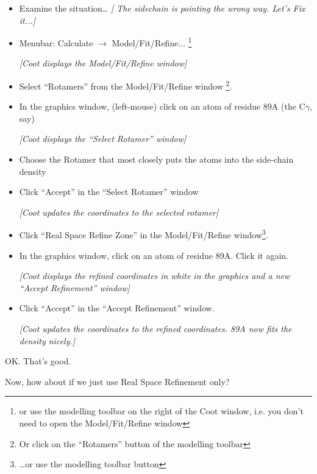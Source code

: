 \documentclass{article}
\begin{document}
\begin{itemize}
\item Examine the situation\ldots
  \emph{[ The sidechain is pointing the wrong way.  Let's Fix it...]}

\item Menubar: \textsf{Calculate $\rightarrow$ Model/Fit/Refine...}
\footnote{or use the modelling toolbar on the right of the Coot window, 
i.e. you don't need to open the Model/Fit/Refine window}

\textsl{ [Coot displays the Model/Fit/Refine window]}

\item Select \textsf{``Rotamers''} from the Model/Fit/Refine window
\footnote{Or click on the \textsf{``Rotamers''} button of the modelling 
toolbar}.
  
\item In the graphics window, (left-mouse) click on an atom of residue
  89A (the C$\gamma$, say)

\textsl{ [Coot displays the ``Select Rotamer'' window]}

\item Choose the Rotamer that most closely puts the atoms into the
  side-chain density %

\item Click \textsf{``Accept''} in the ``Select Rotamer'' window

\textsl{ [Coot updates the coordinates to the selected rotamer]}

\item Click \textsf{``Real Space Refine Zone''} in the
  Model/Fit/Refine window\footnote{\ldots or use the modelling toolbar button}.
  
\item In the graphics window, click on an atom of residue 89A.  Click
  it again.
  
  \textsl{ [Coot displays the refined coordinates in white in the
    graphics and a new ``Accept Refinement'' window]}

\item Click \textsf{``Accept''} in the ``Accept Refinement'' window.
  
  \textsl{ [Coot updates the coordinates to the refined coordinates.
    89A now fits the density nicely.]}


\end{itemize}

OK. That's good.  

Now, how about if we just use Real Space Refinement only?
\end{document}
